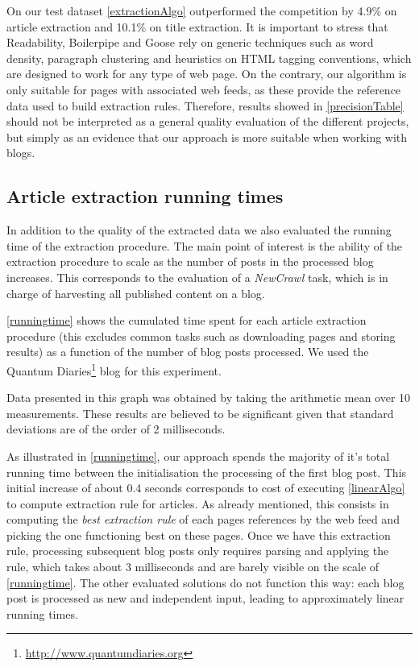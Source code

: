 \precisionTable

On our test dataset \autoref{extractionAlgo} outperformed the competition by 4.9\% on article extraction and 10.1\% on title extraction. It is important to stress that Readability, Boilerpipe and Goose rely on generic techniques such as word density, paragraph clustering and heuristics on HTML tagging conventions, which are designed to work for any type of web page. On the contrary, our algorithm is only suitable for pages with associated web feeds, as these provide the reference data used to build extraction rules. Therefore, results showed in \autoref{precisionTable} should not be interpreted as a general quality evaluation of the different projects, but simply as an evidence that our approach is more suitable when working with blogs.


\subsection{Article extraction running times}

In addition to the quality of the extracted data we also evaluated the running time of the extraction procedure. The main point of interest is the ability of the extraction procedure to scale as the number of posts in the processed blog increases. This corresponds to the evaluation of a \emph{NewCrawl} task, which is in charge of harvesting all published content on a blog.

\autoref{runningtime} shows the cumulated time spent for each article extraction procedure (this excludes common tasks such as downloading pages and storing results) as a function of the number of blog posts processed. We used the Quantum Diaries\footnote{\url{http://www.quantumdiaries.org}} blog for this experiment.

Data presented in this graph was obtained by taking the arithmetic mean over 10 measurements. These results are believed to be significant given that standard deviations are of the order of 2 milliseconds.



As illustrated in \autoref{runningtime}, our approach spends the majority of it's total running time between the initialisation the processing of the first blog post. This initial increase of about 0.4 seconds corresponds to cost of executing \autoref{linearAlgo} to compute extraction rule for articles. As already mentioned, this consists in computing the \emph{best extraction rule} of each pages references by the web feed and picking the one functioning best on these pages. Once we have this extraction rule, processing subsequent blog posts only requires parsing and applying the rule, which takes about 3 milliseconds and are barely visible on the scale of \autoref{runningtime}. The other evaluated solutions do not function this way: each blog post is processed as new and independent input, leading to approximately linear running times.

